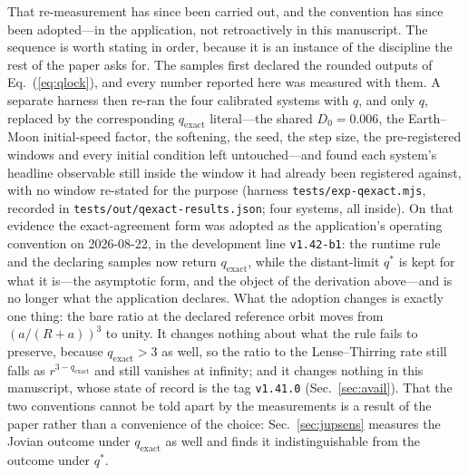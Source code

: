 \documentclass[aps,reprint,amsmath,amssymb,nofootinbib,superscriptaddress,floatfix]{revtex4-2}
\begin{document}
That re-measurement has since been carried out, and the convention has
since been adopted---in the application, not retroactively in this
manuscript.
The sequence is worth stating in order, because it is an instance of
the discipline the rest of the paper asks for.
The samples first declared the rounded outputs of Eq.~(\ref{eq:qlock}),
and every number reported here was measured with them.
A separate harness then re-ran the four calibrated systems with $q$,
and only $q$, replaced by the corresponding $q_{\mathrm{exact}}$
literal---the shared $D_0=0.006$, the Earth--Moon initial-speed factor,
the softening, the seed, the step size, the pre-registered windows and
every initial condition left untouched---and found each system's
headline observable still inside the window it had already been
registered against, with no window re-stated for the purpose (harness
\texttt{tests/exp-qexact.mjs}, recorded in
\texttt{tests/out/qexact-results.json}; four systems, all inside).
On that evidence the exact-agreement form was adopted as the
application's operating convention on 2026-08-22, in the development
line \texttt{v1.42-b1}: the runtime rule and the declaring samples now
return $q_{\mathrm{exact}}$, while the distant-limit $q^{*}$ is kept
for what it is---the asymptotic form, and the object of the derivation
above---and is no longer what the application declares.
What the adoption changes is exactly one thing: the bare ratio at the
declared reference orbit moves from $(a/(R+a))^{3}$ to unity.
It changes nothing about what the rule fails to preserve, because
$q_{\mathrm{exact}}>3$ as well, so the ratio to the Lense--Thirring
rate still falls as $r^{3-q_{\mathrm{exact}}}$ and still vanishes at
infinity; and it changes nothing in this manuscript, whose state of
record is the tag \texttt{v1.41.0} (Sec.~\ref{sec:avail}).
That the two conventions cannot be told apart by the measurements is a
result of the paper rather than a convenience of the choice:
Sec.~\ref{sec:jupsens} measures the Jovian outcome under
$q_{\mathrm{exact}}$ as well and finds it indistinguishable from the
outcome under $q^{*}$.
\end{document}
